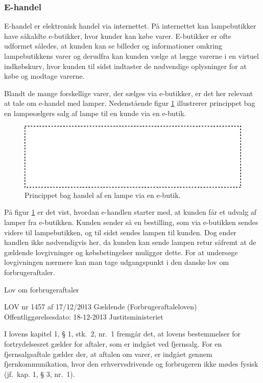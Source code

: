 \subsubsection{E-handel}
\label{sec:ehandel}
E-handel er elektronisk handel via internettet\cite{ddo_ehandel}. På internettet kan lampebutikker have såkaldte e-butikker, hvor kunder kan købe varer\cite{ddo_ebutik}. E-butikker er ofte udformet således, at kunden kan se billeder og informationer omkring lampebutikkens varer og derudfra kan kunden vælge at lægge varerne i en virtuel indkøbskurv, hvor kunden til sidst indtaster de nødvendige oplysninger for at købe og modtage varerne.

Blandt de mange forskellige varer, der sælges via e-butikker, er det her relevant at tale om e-handel med lamper. Nedenstående figur \ref{fig:e_handel_med_lamper} illustrerer princippet bag en lampesælgers salg af lampe til en kunde via en e-butik.

\begin{figure}[H]
  \includegraphics{e_handel_med_lampe.pdf}
  \caption{Princippet bag handel af en lampe via en e-butik.}
    \label{fig:e_handel_med_lamper}
\end{figure}

På figur \ref{fig:e_handel_med_lamper} er det vist, hvordan e-handlen starter med, at kunden får et udvalg af lamper fra e-butikken. Kunden sender så en bestilling, som via e-butikken sendes videre til lampebutikken, og til sidst sendes lampen til kunden. Dog ender handlen ikke nødvendigvis her, da kunden kan sende lampen retur såfremt at de gældende lovgivninger og købsbetingelser muliggør dette. For at undersøge lovgivningen nærmere kan man tage udgangspunkt i den danske lov om forbrugeraftaler\cite{retsinformationen}.

%
Lov om forbrugeraftaler

LOV nr 1457 af 17/12/2013 Gældende
(Forbrugeraftaleloven)
Offentliggørelsesdato: 18-12-2013
Justitsministeriet
%

I lovens kapitel 1, § 1, stk.\ 2, nr.\ 1 fremgår det, at lovens bestemmelser for fortrydelsesret gælder for aftaler, som er indgået ved fjernsalg. For en  fjernsalgsaftale gælder der, at aftalen om varer, er indgået gennem fjernkommunikation, hvor den erhvervsdrivende og forbrugeren ikke mødes fysisk (jf.\ kap. 1, § 3, nr.\ 1).

